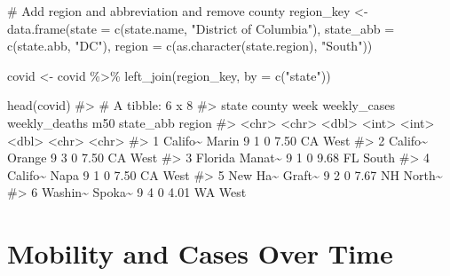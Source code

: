 \documentclass[
  letterpaper,
]{latex/krantz}
\makeatletter
\newenvironment{Shaded}{\begin{snugshade}}{\end{snugshade}}
\newcommand{\AttributeTok}[1]{\textcolor[rgb]{0.40,0.45,0.13}{#1}}
\newcommand{\CommentTok}[1]{\textcolor[rgb]{0.37,0.37,0.37}{#1}}
\newcommand{\FunctionTok}[1]{\textcolor[rgb]{0.28,0.35,0.67}{#1}}
\newcommand{\NormalTok}[1]{\textcolor[rgb]{0.00,0.23,0.31}{#1}}
\newcommand{\OtherTok}[1]{\textcolor[rgb]{0.00,0.23,0.31}{#1}}
\newcommand{\SpecialCharTok}[1]{\textcolor[rgb]{0.37,0.37,0.37}{#1}}
\newcommand{\StringTok}[1]{\textcolor[rgb]{0.13,0.47,0.30}{#1}}
\newenvironment{kframe}{%
\medskip{}
\setlength{\fboxsep}{.8em}
 \def\at@end@of@kframe{}%
 \ifinner\ifhmode%
  \def\at@end@of@kframe{\end{minipage}}%
  \begin{minipage}{\columnwidth}%
 \fi\fi%
 \def\FrameCommand##1{\hskip\@totalleftmargin \hskip-\fboxsep
 \colorbox{shadecolor}{##1}\hskip-\fboxsep
     \hskip-\linewidth \hskip-\@totalleftmargin \hskip\columnwidth}%
 \MakeFramed {\advance\hsize-\width
   \@totalleftmargin\z@ \linewidth\hsize
   \@setminipage}}%
 {\par\unskip\endMakeFramed%
 \at@end@of@kframe}
\renewenvironment{Shaded}{\begin{kframe}}{\end{kframe}}
\makeatother
\begin{document}
\begin{Shaded}
\begin{Highlighting}[]
\CommentTok{\# Add region and abbreviation and remove county}
\NormalTok{region\_key }\OtherTok{\textless{}{-}} \FunctionTok{data.frame}\NormalTok{(}\AttributeTok{state =} \FunctionTok{c}\NormalTok{(state.name, }
                                   \StringTok{"District of Columbia"}\NormalTok{), }
                         \AttributeTok{state\_abb =} \FunctionTok{c}\NormalTok{(state.abb, }\StringTok{"DC"}\NormalTok{),}
                         \AttributeTok{region =} \FunctionTok{c}\NormalTok{(}\FunctionTok{as.character}\NormalTok{(state.region), }
                                    \StringTok{"South"}\NormalTok{))}

\NormalTok{covid }\OtherTok{\textless{}{-}}\NormalTok{ covid }\SpecialCharTok{\%\textgreater{}\%}
  \FunctionTok{left\_join}\NormalTok{(region\_key, }\AttributeTok{by =} \FunctionTok{c}\NormalTok{(}\StringTok{"state"}\NormalTok{)) }

\FunctionTok{head}\NormalTok{(covid)}
\CommentTok{\#\textgreater{} \# A tibble: 6 x 8}
\CommentTok{\#\textgreater{}   state   county  week weekly\_cases weekly\_deaths   m50 state\_abb region}
\CommentTok{\#\textgreater{}   \textless{}chr\textgreater{}   \textless{}chr\textgreater{}  \textless{}dbl\textgreater{}        \textless{}int\textgreater{}         \textless{}int\textgreater{} \textless{}dbl\textgreater{} \textless{}chr\textgreater{}     \textless{}chr\textgreater{} }
\CommentTok{\#\textgreater{} 1 Califo\textasciitilde{} Marin      9            1             0  7.50 CA        West  }
\CommentTok{\#\textgreater{} 2 Califo\textasciitilde{} Orange     9            3             0  7.50 CA        West  }
\CommentTok{\#\textgreater{} 3 Florida Manat\textasciitilde{}     9            1             0  9.68 FL        South }
\CommentTok{\#\textgreater{} 4 Califo\textasciitilde{} Napa       9            1             0  7.50 CA        West  }
\CommentTok{\#\textgreater{} 5 New Ha\textasciitilde{} Graft\textasciitilde{}     9            2             0  7.67 NH        North\textasciitilde{}}
\CommentTok{\#\textgreater{} 6 Washin\textasciitilde{} Spoka\textasciitilde{}     9            4             0  4.01 WA        West}
\end{Highlighting}
\end{Shaded}

\section{Mobility and Cases Over
Time}\label{mobility-and-cases-over-time}
\end{document}
